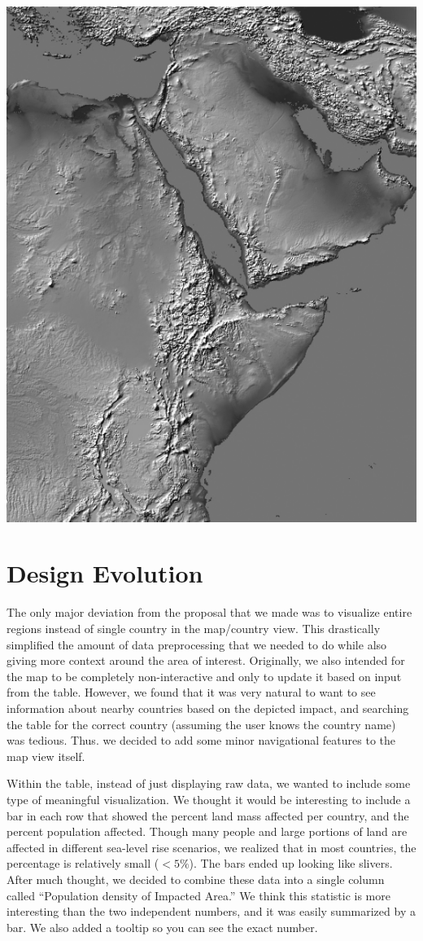\documentclass[12pt]{article}
\begin{document}
		\includegraphics[scale=0.8]{images/data.png}

	\section{Design Evolution}
		The only major deviation from the proposal that we made was to visualize entire regions instead of single country in the map/country view.
		This drastically simplified the amount of data preprocessing that we needed to do while also giving more context around the area of interest.
		Originally, we also intended for the map to be completely non-interactive and only to update it based on input from the table.
		However, we found that it was very natural to want to see information about nearby countries based on the depicted impact, and searching the table for the correct country (assuming the user knows the country name) was tedious.
		Thus. we decided to add some minor navigational features to the map view itself.

		Within the table, instead of just displaying raw data, we wanted to include some type of meaningful visualization.
		We thought it would be interesting to include a bar in each row that showed the percent land mass affected per country, and the percent population affected.
		Though many people and large portions of land are affected in different sea-level rise scenarios, we realized that in most countries, the percentage is relatively small ($<5\%$).
		The bars ended up looking like slivers.
		After much thought, we decided to combine these data into a single column called ``Population density of Impacted Area.''
		We think this statistic is more interesting than the two independent numbers, and it was easily summarized by a bar.
		We also added a tooltip so you can see the exact number.
\end{document}
